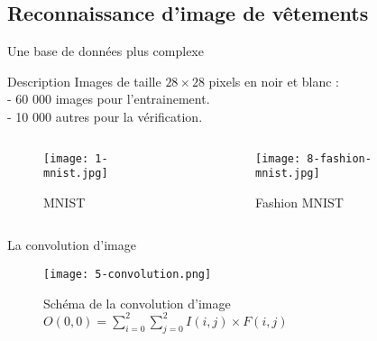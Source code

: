 \subsection{Reconnaissance d’image de vêtements }

\begin{frame}{Une base de données plus complexe}
    \begin{block}{Description}
        Images de taille $28 \times 28$ pixels en noir et blanc : \\
        \quad - 60 000 images pour l'entrainement. \\
        \quad - 10 000 autres pour la vérification.
    \end{block}
    \begin{columns}
        \begin{column}{0.5\textwidth}
            \begin{figure}
                \centering
                \texttt{[image: 1-mnist.jpg]}
                \caption{MNIST}
            \end{figure}
        \end{column}
        \begin{column}{0.5\textwidth}
            \begin{figure}
                \centering
                \texttt{[image: 8-fashion-mnist.jpg]}
                \caption{Fashion MNIST}
            \end{figure}
        \end{column}
    \end{columns}
\end{frame}


\begin{frame}{La convolution d'image}
    \begin{figure}
        \centering
        \texttt{[image: 5-convolution.png]}
        \centering
        \caption{Schéma de la convolution d'image $O(0, 0) = \sum_{i=0}^{2}\sum_{j=0}^{2}I(i, j)\times F(i, j)$}
    \end{figure}
\end{frame}


